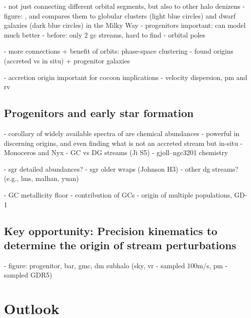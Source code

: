 \documentclass[final,5p,times,twocolumn,authoryear]{elsarticle}
\begin{document}
- not just connecting different orbital segments, but also to other halo denizens
- figure: , and compares them to globular clusters (light blue circles) and dwarf galaxies (dark blue circles) in the Milky Way
- progenitors important: can model much better \citep{kupper:2015}
- before: only 2 gc streams, hard to find \citep{balbinot}
- orbital poles



- more connections + benefit of orbits: phase-space clustering \citep{bonaca:2021}
- found origins (accreted vs in situ) + progenitor galaxies

- accretion origin important for cocoon implications
- velocity dispersion, pm and rv


\subsection{Progenitors and early star formation}
- corollary of widely available spectra of are chemical abundances
- powerful in discerning origins, and even finding what is not an accreted stream but in-situ
- Monoceros and Nyx
- GC vs DG streams (Ji S5)
- gjoll--ngc3201 chemistry \citep{hansen:2020}

- sgr detailed abundances?
- sgr older wraps (Johnson H3)
- other dg streams? (e.g., lms, malhan, yuan)

- GC metallicity floor
- contribution of GCs
- origin of multiple populations, GD-1


\subsection{Key opportunity: Precision kinematics to determine the origin of stream perturbations}
- figure: progenitor, bar, gmc, dm subhalo (sky, vr - sampled 100m/s, pm - sampled GDR5)



\section{Outlook}
\label{sec:outlook}
\end{document}
